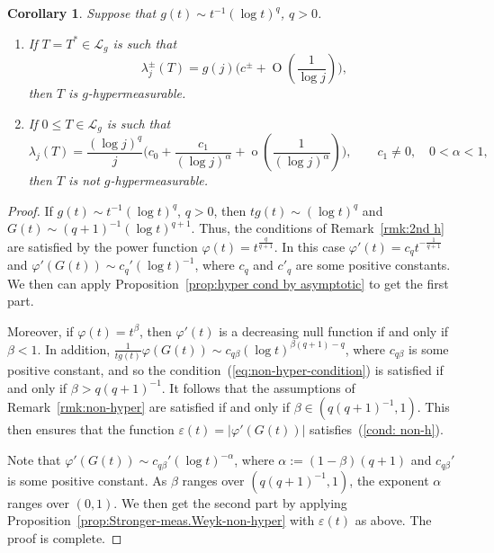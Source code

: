 \documentclass[10pt, a4paper]{amsart}
\newcommand{\sL}{\mathscr{L}}
\newcommand{\op}{\operatorname}
\numberwithin{equation}{section}
\newtheorem{corollary}[theorem]{Corollary}
\theoremstyle{definition}
\theoremstyle{remark}
\begin{document}
\begin{corollary}\label{cor:Hyper.Weyl-hyper.sLpq}
 Suppose that  $g(t)\sim t^{-1}(\log t)^q$, $q>0$.
 \begin{enumerate}
 \item If $T=T^*\in \sL_g$ is such that
   \begin{equation*}
 \lambda_j^\pm(T) =g(j)\bigg(c^{\pm} + \op{O}\left(\frac{1}{\log j}\right) \bigg),
\end{equation*}
then $T$ is $g$-hypermeasurable.

\item If $0\leq T\in \sL_g$ is such that
  \begin{equation*}
 \lambda_j(T) = \frac{(\log j)^q}{j}\bigg(c_0 + \frac{c_1}{(\log j)^\alpha}+ \op{o}\left(\frac{1}{(\log j)^\alpha}\right) \bigg), \qquad c_1\neq 0,  \quad 0<\alpha<1,
\end{equation*}
then $T$ is not $g$-hypermeasurable.
\end{enumerate}
\end{corollary}
\begin{proof}
 If $g(t)\sim t^{-1}(\log t)^q$, $q>0$, then $tg(t)\sim (\log t)^q$ and $G(t)\sim (q+1)^{-1}(\log t)^{q+1}$. Thus, the conditions of Remark~\ref{rmk:2nd h} are satisfied by
the power function $\varphi(t)=t^{\frac{q}{q+1}}$. In this case $\varphi'(t)=c_q t^{-\frac{1}{q+1}}$ and $\varphi'(G(t))\sim c_q'(\log t)^{-1}$, where $c_q$ and $c'_q$ are some positive constants. We then can apply Proposition~\ref{prop:hyper cond by asymptotic} to get the first part.

Moreover, if $\varphi(t)=t^\beta$, then $\varphi'(t)$ is a decreasing null function if and only if $\beta<1$. In addition, $\frac{1}{tg(t)}\varphi(G(t))\sim c_{q\beta}(\log t)^{\beta(q+1)-q}$, where $c_{q\beta}$ is some positive constant, and so the condition~(\ref{eq:non-hyper-condition}) is satisfied if and only if $\beta> q(q+1)^{-1}$. It follows that the assumptions of Remark~\ref{rmk:non-hyper} are satisfied if and only if $\beta\in (q(q+1)^{-1},1)$. This then ensures that the function $\varepsilon(t)=|\varphi'(G(t))|$ satisfies~(\ref{cond: non-h}).  

Note that $\varphi'(G(t))\sim c_{q\beta}'(\log t)^{-\alpha}$, where  $\alpha:=(1-\beta)(q+1)$ and $c_{q\beta}'$ is some positive constant. As $\beta$ ranges over $(q(q+1)^{-1},1)$, the exponent $\alpha$ ranges over $(0,1)$. We then get the second part by applying Proposition~\ref{prop:Stronger-meas.Weyk-non-hyper} with $\varepsilon(t)$ as above. The proof is complete.
\end{proof}
\end{document}
